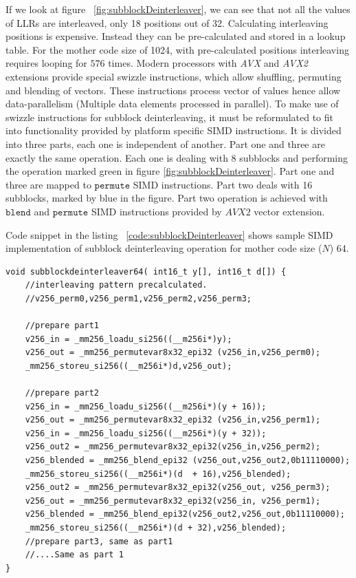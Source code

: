 If we look at figure ~\ref{fig:subblockDeinterleaver}, we can see that not all the values of LLRs are interleaved, only 18 positions out of 32. Calculating interleaving positions is expensive. Instead they can be pre-calculated and stored in a lookup table. For the mother code size of 1024, with pre-calculated positions interleaving requires looping for $ 576 $ times. Modern processors with \textit{AVX} and \textit{AVX2} extensions provide special swizzle instructions, which allow shuffling, permuting and blending of vectors. These instructions process vector of values hence allow data-parallelism (Multiple data elements processed in parallel). To make use of swizzle instructions for subblock deinterleaving, it must be reformulated to fit into functionality provided by platform specific SIMD instructions. It is divided into three parts, each one is independent of another. Part one and three are exactly the same operation. Each one is dealing with 8 subblocks and performing the operation marked green in figure \ref{fig:subblockDeinterleaver}. Part one and three are mapped to $\mathtt{permute}$ SIMD instructions. Part two deals with 16 subblocks, marked by blue in the figure. Part two operation is achieved with $\mathtt{blend}$ and $\mathtt{permute}$ SIMD instructions provided by $ AVX2 $ vector extension.

Code snippet in the listing ~\ref{code:subblockDeinterleaver} shows sample SIMD implementation of subblock deinterleaving operation for mother code size ($N$) 64.

\begin{code}
\label{code:subblockDeinterleaver}
\begin{verbatim}
void subblockdeinterleaver64( int16_t y[], int16_t d[]) {	
	//interleaving pattern precalculated.
	//v256_perm0,v256_perm1,v256_perm2,v256_perm3;	

	//prepare part1
	v256_in = _mm256_loadu_si256((__m256i*)y);
	v256_out = _mm256_permutevar8x32_epi32 (v256_in,v256_perm0);
	_mm256_storeu_si256((__m256i*)d,v256_out);
	
	//prepare part2
	v256_in = _mm256_loadu_si256((__m256i*)(y + 16));
	v256_out = _mm256_permutevar8x32_epi32 (v256_in,v256_perm1);
	v256_in = _mm256_loadu_si256((__m256i*)(y + 32));
	v256_out2 = _mm256_permutevar8x32_epi32(v256_in,v256_perm2);
	v256_blended = _mm256_blend_epi32 (v256_out,v256_out2,0b11110000);
	_mm256_storeu_si256((__m256i*)(d  + 16),v256_blended);
	v256_out2 = _mm256_permutevar8x32_epi32(v256_out, v256_perm3);
	v256_out = _mm256_permutevar8x32_epi32(v256_in, v256_perm1);
	v256_blended = _mm256_blend_epi32(v256_out2,v256_out,0b11110000);
	_mm256_storeu_si256((__m256i*)(d + 32),v256_blended);
	//prepare part3, same as part1
	//....Same as part 1
}
\end{verbatim}
\end{code}

